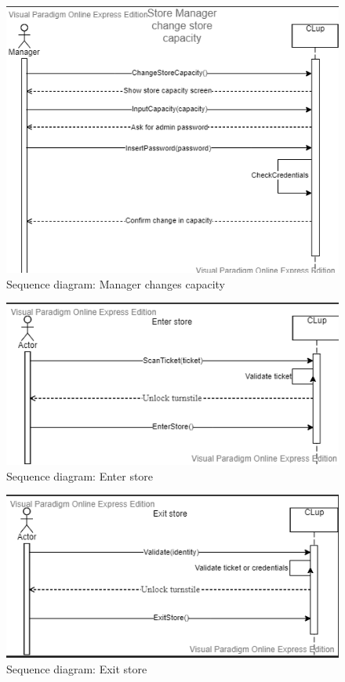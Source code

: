 \begin{figure}[H]
	\includegraphics[width=\linewidth]{../Diagrams/ChangeCapacity.png}
	\caption{Sequence diagram: Manager changes capacity}
	\label{fig:ChangeCap}
\end{figure} 

\begin{figure}[H]
	\includegraphics[width=\linewidth]{../Diagrams/EnterStore.png}
	\caption{Sequence diagram: Enter store}
	\label{fig:EnterStore}
\end{figure} 

\begin{figure}[H]
	\includegraphics[width=\linewidth]{../Diagrams/ExitStore.png}
	\caption{Sequence diagram: Exit store}
	\label{fig:ExitStore}
\end{figure} 

